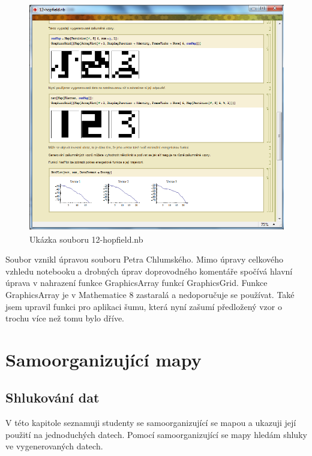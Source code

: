 \documentclass[11pt,twoside,a4paper]{book}
\begin{document}
\begin{figure}[h!]
\begin{center}
\includegraphics[height=10cm]{figures/ukazka12.png}
\caption{Ukázka souboru 12-hopfield.nb}
\label{fig:hopfield}
\end{center}
\end{figure}

Soubor vznikl úpravou souboru Petra Chlumského.\cite{chlumsky} Mimo úpravy celkového vzhledu notebooku a drobných úprav doprovodného komentáře spočívá hlavní úprava v nahrazení funkce GraphicsArray funkcí GraphicsGrid. Funkce GraphicsArray je v Mathematice 8 zastaralá a nedoporučuje se používat. Také jsem upravil funkci pro aplikaci šumu, která nyní zašumí předložený vzor o trochu více než tomu bylo dříve.
\newpage
\section{Samoorganizující mapy}
\subsection{Shlukování dat}
V této kapitole seznamuji studenty se samoorganizující se mapou a ukazuji její použití na jednoduchých datech. Pomocí samoorganizující se mapy hledám shluky ve vygenerovaných datech.
\end{document}
